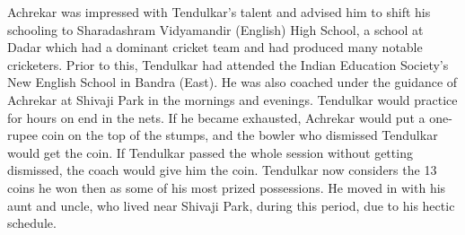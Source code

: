 \documentclass{report}
\begin{document}
Achrekar was impressed with Tendulkar's talent and advised him to shift his schooling to Sharadashram Vidyamandir (English) High School, a school at Dadar which had a dominant cricket team and had produced many notable cricketers. Prior to this, Tendulkar had attended the Indian Education Society's New English School in Bandra (East). He was also coached under the guidance of Achrekar at Shivaji Park in the mornings and evenings. Tendulkar would practice for hours on end in the nets. If he became exhausted, Achrekar would put a one-rupee coin on the top of the stumps, and the bowler who dismissed Tendulkar would get the coin. If Tendulkar passed the whole session without getting dismissed, the coach would give him the coin. Tendulkar now considers the 13 coins he won then as some of his most prized possessions. He moved in with his aunt and uncle, who lived near Shivaji Park, during this period, due to his hectic schedule.
\end{document}
